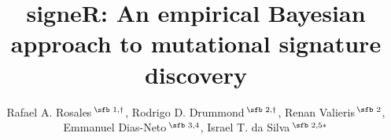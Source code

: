 \documentclass{bioinfo}
\begin{document}
\title[empirical Bayesian NMF]{signeR: An empirical Bayesian approach
  to mutational signature discovery}
\author[Rosales, R. A. and Drummond, R. D.~\textit{et~al}.]{
    Rafael A. Rosales\,$^{\text{\sfb 1,}\dagger}$,
    Rodrigo D. Drummond\,$^{\text{\sfb 2,}\dagger}$,
    Renan Valieris\,$^{\text{\sfb 2}}$,
    Emmanuel Dias-Neto\,$^{\text{\sfb 3,4}}$,
    Israel T. da Silva\,$^{\text{\sfb 2,5}*}$}
\address{%
   $^{\text{\sf 1}}$Departamento de Computa\c{c}\~ao e
   Matem\'atica, Universidade de S\~ao Paulo, SP 14040-901, Brazil,
   $^{\text{\sf 2}}$Laboratory of Bioinformatics and Computational
   Biology, A. C. Camargo Cancer Center, SP  01509-010,
   Brazil, $^{\text{\sf 3}}$Laboratory of Medical Genomics,
   A. C. Camargo Cancer Center, SP 01509-010, Brazil,
   $^{\text{\sf  4}}$Laboratory of Neurosciences (LIM27),
   Department and Institute of Psychiatry, Faculty of Medicine,
   University of S\~ao Paulo, SP 05403-903, Brazil,
   $^{\text{\sf 5}}$Laboratory of Molecular Immunology, The
   Rockefeller University, NY 10065, USA\\[1em]
   {\normalsize $^{\dagger}$The authors wish it to be known
   that, in their opinion, the first two authors should be regarded
   as joint First Authors}
}
\end{document}
